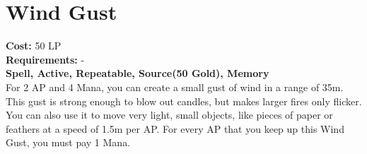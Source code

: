 \section{Wind Gust}\label{spell:windGust}
\textbf{Cost:} 50 LP\\
\textbf{Requirements:} -\\
\textbf{Spell, Active, Repeatable, Source(50 Gold), Memory}\\
For 2 AP and 4 Mana, you can create a small gust of wind in a range of 35m.
This gust is strong enough to blow out candles, but makes larger fires only flicker.
You can also use it to move very light, small objects, like pieces of paper or feathers at a speed of 1.5m per AP.
For every AP that you keep up this Wind Gust, you must pay 1 Mana.